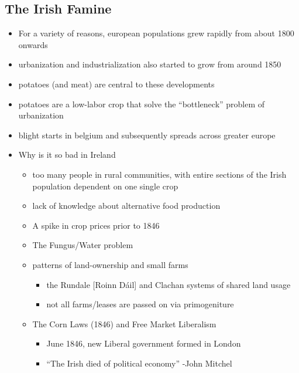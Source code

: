 \documentclass[12pt]{article}
\begin{document}
        \subsection{The Irish Famine}
            \begin{itemize}
                \item For a variety of reasons, european populations grew rapidly from about 1800 onwards
                \item urbanization and industrialization also started to grow from around 1850
                \item potatoes (and meat) are central to these developments
                \item potatoes are a low-labor crop that solve the ``bottleneck'' problem of urbanization
                \item blight starts in belgium and subsequently spreads across greater europe
                \item Why is it so bad in Ireland
                \begin{itemize}
                    \item too many people in rural communities, with entire sections of the Irish population dependent on one single crop
                    \item lack of knowledge about alternative food production
                    \item A spike in crop prices prior to 1846
                    \item The Fungus/Water problem
                    \item patterns of land-ownership and small farms
                    \begin{itemize}
                        \item the Rundale [Roinn Dáil] and Clachan systems of shared land usage
                        \item not all farms/leases are passed on via primogeniture
                    \end{itemize}
                    \item The Corn Laws (1846) and Free Market Liberalism
                    \begin{itemize}
                        \item June 1846, new Liberal government formed in London
                        \item ``The Irish died of political economy'' -John Mitchel
                    \end{itemize}

\end{itemize}
\end{itemize}
\end{document}
